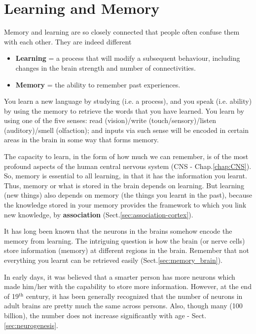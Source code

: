 \def\pre{{\text{pre}}}
\def\post{{\text{post}}}
\def\Ca{{\text{Ca}^{2+}}}

\chapter{Learning and Memory}
\label{chap:memory}

Memory and learning are so closely connected that people often confuse them with
each other. They are indeed different
\begin{itemize}
  
  \item {\bf Learning} = a process that will modify a subsequent behaviour,
  including changes in the brain strength and number of connectivities.
  
  \item {\bf Memory} = the ability to remember past experiences.
\end{itemize} 
You learn a new language by studying (i.e. a process), and you speak (i.e.
ability) by using the memory to retrieve the words that you have learned.
You learn by using one of the five senses: read (vision)/write
(touch/sensory)/listen (auditory)/smell (olfaction); and inputs via such sense
will be encoded in certain areas in the brain in some way that forms memory.

The capacity to learn, in the form of how much we can remember, is of the most
profound aspects of the human central nervous system (CNS -
Chap.\ref{chap:CNS}). So, memory is essential to all learning, in that it has
the information you learnt. Thus, memory or what is stored in the brain depends
on learning. But learning (new things) also depends on memory (the things you
learnt in the past), because the knowledge stored in your memory provides the
framework to which you link new knowledge, by {\bf association}
(Sect.\ref{sec:association-cortex}).

It has long been known that the neurons in the brains somehow encode the memory
from learning. The intriguing question is how the brain (or nerve cells) store
information (memory) at different regions in the brain. Remember that not
everything you learnt can be retrieved easily (Sect.\ref{sec:memory_brain}).

In early days, it was believed that a smarter person has more neurons which made
him/her with the capability to store more information. However, at the end of
19$^\text{th}$ century, it has been generally recognized that the number of
neurons in adult brains are pretty much the same across persons. Also, though
many (100 billion), the number does not increase significantly with age -
Sect.\ref{sec:neurogenesis}.

